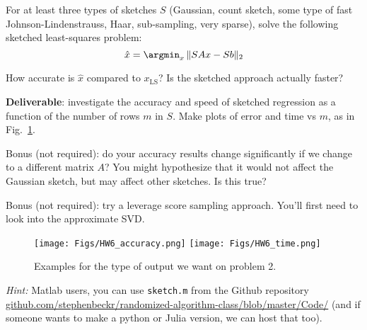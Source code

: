 \documentclass[10pt, letterpaper]{scrartcl}
\begin{document}
\begin{enumerate}[align=left, leftmargin=*, label=\sffamily\bfseries Problem \arabic*:]
    For at least three types of sketches $S$ (Gaussian, count sketch, some type of fast Johnson-Lindenstrauss, Haar, sub-sampling, very sparse), solve the following sketched least-squares problem:
    $$ \hat{x} = \argmin_{x} \, \| SAx - Sb\|_2
    $$
    
    How accurate is $\hat{x}$ compared to $x_\text{LS}$? Is the sketched approach actually faster?
    
        \textbf{Deliverable}: investigate the accuracy and speed of sketched regression as a function of the number of rows $m$ in $S$. Make plots 
        of error and time vs $m$, as in Fig.~\ref{fig:1}.  
        
        Bonus (not required): do your accuracy results change significantly if we change to a different matrix $A$? You might hypothesize that it would not affect the Gaussian sketch, but may affect other sketches. Is this true?
        
        Bonus (not required): try a leverage score sampling approach. You'll first need to look into the approximate SVD.
    
    
    
\begin{figure}
    \centering
    \texttt{[image: Figs/HW6\_accuracy.png]}
    \texttt{[image: Figs/HW6\_time.png]}
\caption{Examples for the type of output we want on problem 2.}
\label{fig:1}
\end{figure}
    
        \emph{Hint:} 
        Matlab users, you can use \texttt{sketch.m} from the Github repository \\ \href{https://github.com/stephenbeckr/randomized-algorithm-class/blob/master/Code/}{github.com/stephenbeckr/randomized-algorithm-class/blob/master/Code/}
        (and if someone wants to make a python or Julia version, we can host that too).

\end{enumerate}   
\end{document}
